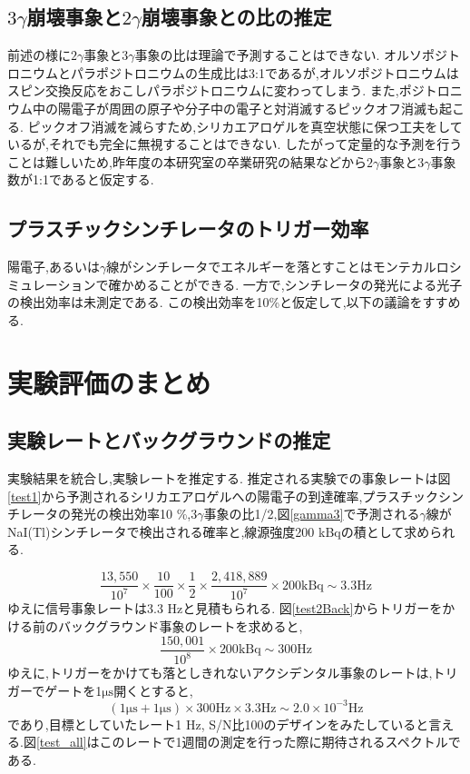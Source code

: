 \subsection{$3\gamma$崩壊事象と$2\gamma$崩壊事象との比の推定}
前述の様に$2\gamma$事象と$3\gamma$事象の比は理論で予測することはできない.
オルソポジトロニウムとパラポジトロニウムの生成比は3:1であるが,オルソポジトロニウムはスピン交換反応をおこしパラポジトロニウムに変わってしまう.
また,ポジトロニウム中の陽電子が周囲の原子や分子中の電子と対消滅するピックオフ消滅も起こる.
ピックオフ消滅を減らすため,シリカエアロゲルを真空状態に保つ工夫をしているが,それでも完全に無視することはできない.
したがって定量的な予測を行うことは難しいため,昨年度の本研究室の卒業研究の結果\cite{卒業論文2015}などから$2\gamma$事象と$3\gamma$事象数が1:1であると仮定する.


\subsection{プラスチックシンチレータのトリガー効率}
陽電子,あるいは$\gamma$線がシンチレータでエネルギーを落とすことはモンテカルロシミュレーションで確かめることができる.
一方で,シンチレータの発光による光子の検出効率は未測定である.
この検出効率を10\%と仮定して,以下の議論をすすめる.

\section{実験評価のまとめ}
\label{section_testall}

\subsection{実験レートとバックグラウンドの推定}
実験結果を統合し,実験レートを推定する.
推定される実験での事象レートは図\ref{test1}から予測されるシリカエアロゲルへの陽電子の到達確率,プラスチックシンチレータの発光の検出効率10 \%,$3\gamma$事象の比1/2,図\ref{gamma3}で予測される$\gamma$線がNaI(Tl)シンチレータで検出される確率と,線源強度200 kBqの積として求められる.

\begin{equation}
	\nonumber
	\frac{13,550}{10^7} \times \frac{10}{100} \times \frac{1}{2} \times \frac{2,418,889}{10^7} \times 200 \mathrm{kBq} \sim 3.3 \mathrm{Hz}
\end{equation}
ゆえに信号事象レートは3.3 Hzと見積もられる.
図\ref{test2Back}からトリガーをかける前のバックグラウンド事象のレートを求めると,
\begin{equation}
	\nonumber
	\frac{150,001}{10^8} \times 200 \mathrm{kBq} \sim 300 \mathrm{ Hz}
\end{equation}
ゆえに,トリガーをかけても落としきれないアクシデンタル事象のレートは,トリガーでゲートを1$\si{\micro \second}$開くとすると,
\begin{equation}
	\nonumber
	( 1 \si{\micro \second} + 1 \si{\micro \second}) \times  300 \mathrm{Hz} \times 3.3 \mathrm{Hz} \sim 2.0 \times 10^{-3} \mathrm{Hz}
\end{equation}
であり,目標としていたレート1 Hz, S/N比100のデザインをみたしていると言える.図\ref{test_all}はこのレートで1週間の測定を行った際に期待されるスペクトルである.

